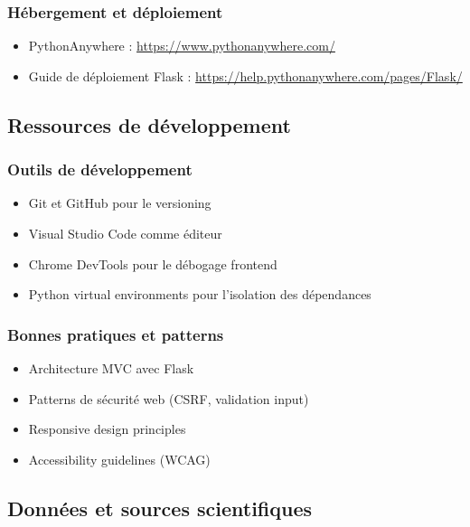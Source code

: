 \documentclass[a4paper,11pt]{article}
\begin{document}
    \subsubsection{Hébergement et déploiement}
        \begin{itemize}
            \item PythonAnywhere : \url{https://www.pythonanywhere.com/}
            \item Guide de déploiement Flask : \url{https://help.pythonanywhere.com/pages/Flask/}
        \end{itemize}

    \subsection{Ressources de développement}

        \subsubsection{Outils de développement}
            \begin{itemize}
                \item Git et GitHub pour le versioning
                \item Visual Studio Code comme éditeur
                \item Chrome DevTools pour le débogage frontend
                \item Python virtual environments pour l'isolation des dépendances
            \end{itemize}

        \subsubsection{Bonnes pratiques et patterns}
            \begin{itemize}
                \item Architecture MVC avec Flask
                \item Patterns de sécurité web (CSRF, validation input)
                \item Responsive design principles
                \item Accessibility guidelines (WCAG)
            \end{itemize}

    \subsection{Données et sources scientifiques}
\end{document}
